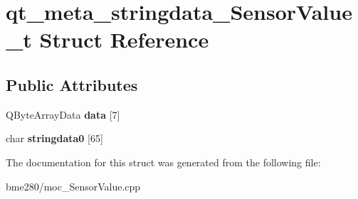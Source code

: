 \hypertarget{structqt__meta__stringdata__SensorValue__t}{}\section{qt\+\_\+meta\+\_\+stringdata\+\_\+\+Sensor\+Value\+\_\+t Struct Reference}
\label{structqt__meta__stringdata__SensorValue__t}
\subsection*{Public Attributes}
\begin{DoxyCompactItemize}
\item 
\mbox{\label{structqt__meta__stringdata__SensorValue__t_a2bc0a913e723cc468f2da6196ffe577b}} 
Q\+Byte\+Array\+Data {\bfseries data} \mbox{[}7\mbox{]}
\item 
\mbox{\label{structqt__meta__stringdata__SensorValue__t_ac5e03baffda19188e30a8d9342a3f348}} 
char {\bfseries stringdata0} \mbox{[}65\mbox{]}
\end{DoxyCompactItemize}


The documentation for this struct was generated from the following file\+:\begin{DoxyCompactItemize}
\item 
bme280/moc\+\_\+\+Sensor\+Value.\+cpp\end{DoxyCompactItemize}
